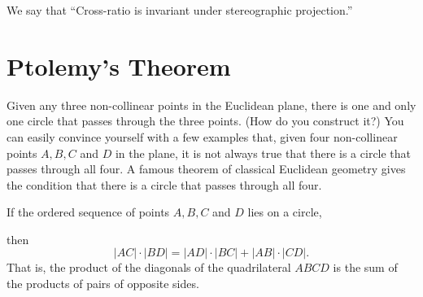 \documentclass{ximera}
\begin{document}
We say that ``Cross-ratio is invariant under stereographic
projection.''

\section*{Ptolemy's Theorem}

Given any three non-collinear points in the Euclidean plane, there is
one and only one circle that passes through the three points. (How do
you construct it?) You can easily convince yourself with a few
examples that, given four non-collinear points $A,B,C$ and $D$ in the
plane, it is not always true that there is a circle that passes
through all four. A famous theorem of classical Euclidean geometry
gives the condition that there is a circle that passes through all
four.

\begin{theorem}[Ptolemy] If the ordered sequence of points $A,B,C$ and $D$ lies on a circle,
\begin{image}
\end{image}
then%
\[
\left\vert AC\right\vert \cdot\left\vert BD\right\vert
=\left\vert AD\right\vert \cdot\left\vert BC\right\vert
+\left\vert AB\right\vert \cdot\left\vert CD\right\vert
.
\]
That is, the product of the diagonals of the quadrilateral $ABCD$ is the sum
of the products of pairs of opposite sides.
\end{theorem}
\end{document}
